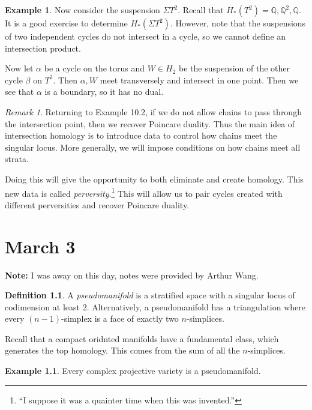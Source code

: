 \documentclass[leqno, openany]{memoir}
\theoremstyle{definition}
\newtheorem{defn}[thm]{Definition}
\newtheorem{exm}[thm]{Example}
\theoremstyle{remark}
\newtheorem{rmk}[thm]{Remark}
\theoremstyle{plain}
\theoremstyle{definition}
\theoremstyle{remark}
\newcommand{\Q}{\mathbb{Q}}
\begin{document}
\begin{exm}
    Now consider the suspension $\Sigma T^2$. Recall that $H_*(T^2) = \Q, \Q^2, \Q$. It is a good exercise to determine $H_*(\Sigma T^2)$. However, note that the suspensions of two independent cycles do not intersect in a cycle, so we cannot define an intersection product.

    Now let $\alpha$ be a cycle on the torus and $W \in H_2$ be the suspension of the other cycle $\beta$ on $T^2$. Then $\alpha, W$ meet transversely and intersect in one point. Then we see that $\alpha$ is a boundary, so it has no dual.
\end{exm}

\begin{rmk}
    Returning to Example 10.2, if we do not allow chains to pass through the intersection point, then we recover Poincare duality. Thus the main idea of intersection homology is to introduce data to control how chains meet the singular locus. More generally, we will impose conditions on how chains meet all strata. 

    Doing this will give the opportunity to both eliminate and create homology. This new data is called \textit{perversity}.\footnote{``I suppose it was a quainter time when this was invented.''} This will allow us to pair cycles created with different perversities and recover Poincare duality.
\end{rmk}

\chapter{March 3}%
\label{cha:march_3}

\textbf{Note:} I was away on this day, notes were provided by Arthur Wang.

\begin{defn}
    A \textit{pseudomanifold} is a stratified space with a singular locus of codimension at least $2$. Alternatively, a pseudomanifold has a triangulation where every $(n-1)$-simplex is a face of exactly two $n$-simplices.
\end{defn}

Recall that a compact oridnted manifolds have a fundamental class, which generates the top homology. This comes from the sum of all the $n$-simplices.

\begin{exm}
    Every complex projective variety is a pseudomanifold.
\end{exm}
\end{document}
